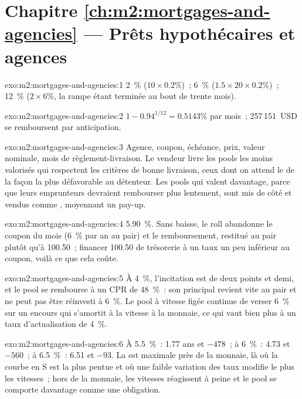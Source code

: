 \section*{Chapitre \ref{ch:m2:mortgages-and-agencies} --- Prêts hypothécaires et agences}

\begin{solution}{exo:m2:mortgages-and-agencies:1}
2~\% ($10 \times 0.2\%$)~; 6~\% ($1.5 \times 20 \times 0.2\%$)~; 12~\% ($2 \times 6\%$,
la rampe étant terminée au bout de trente mois).
\end{solution}

\begin{solution}{exo:m2:mortgages-and-agencies:2}
$1 - 0.94^{1/12} = 0.5143\%$ par mois~; 257\,151~USD se remboursent par anticipation.
\end{solution}

\begin{solution}{exo:m2:mortgages-and-agencies:3}
Agence, coupon, échéance, prix, valeur nominale, mois de règlement-livraison. Le vendeur
livre les pools les moins valorisés qui respectent les critères de bonne livraison, ceux
dont on attend le  de la façon la plus défavorable au détenteur. Les
pools qui valent davantage, parce que leurs emprunteurs devraient rembourser plus lentement, sont
mis de côté et vendus comme , moyennant un pay-up.
\end{solution}

\begin{solution}{exo:m2:mortgages-and-agencies:4}
5.90~\%. Sans baisse, le roll abandonne le coupon du mois (6~\% par an au pair)
et le remboursement, restitué au pair plutôt qu'à 100.50~; financer 100.50 de
trésorerie à un taux un peu inférieur au coupon, voilà ce que cela coûte.
\end{solution}

\begin{solution}{exo:m2:mortgages-and-agencies:5}
À 4~\%, l'incitation est de deux points et demi, et le pool se rembourse à un CPR de
48~\%~: son principal revient vite au pair et ne peut pas être réinvesti à 6~\%.
Le pool à vitesse figée continue de verser 6~\% sur un encours qui s'amortit à la
vitesse à la monnaie, ce qui vaut bien plus à un taux d'actualisation de 4~\%.
\end{solution}

\begin{solution}{exo:m2:mortgages-and-agencies:6}
À 5.5~\%~: 1.77 ans et $-478$~; à 6~\%~: 4.73 et $-560$~; à 6.5~\%~: 6.51 et
$-93$. La  est maximale près de la monnaie, là où la courbe en S est
la plus pentue et où une faible variation des taux modifie le plus les vitesses~; hors de la monnaie, les vitesses
réagissent à peine et le pool se comporte davantage comme une obligation.
\end{solution}

